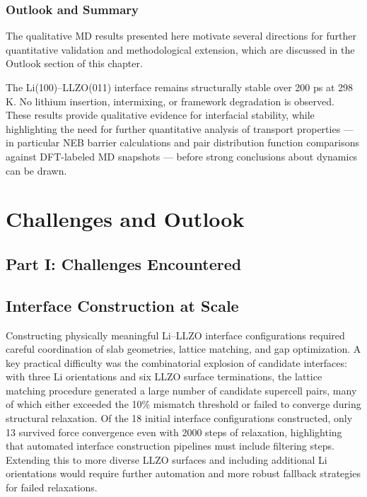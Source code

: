 \documentclass[12pt,a4paper,oneside]{book}
\begin{document}
\subsection{Outlook and Summary}

The qualitative MD results presented here motivate several directions for further
quantitative validation and methodological extension, which are discussed in the Outlook section of this chapter.

The Li(100)--LLZO(011) interface remains structurally stable over 200 ps at 298 K. No lithium insertion, intermixing, or framework degradation is observed. These results provide qualitative evidence for interfacial stability, while
highlighting the need for further quantitative analysis of transport properties ---
in particular NEB barrier calculations and pair distribution function comparisons
against DFT-labeled MD snapshots --- before strong conclusions about dynamics can be drawn.

\chapter{Challenges and Outlook}

\section*{Part I: Challenges Encountered}

\section{Interface Construction at Scale}

Constructing physically meaningful Li--LLZO interface configurations required careful
coordination of slab geometries, lattice matching, and gap optimization. A key
practical difficulty was the combinatorial explosion of candidate interfaces: with
three Li orientations and six LLZO surface terminations, the lattice matching
procedure generated a large number of candidate supercell pairs, many of which
either exceeded the 10\% mismatch threshold or failed to converge during structural
relaxation. Of the 18 initial interface configurations constructed, only 13 survived
force convergence even with 2000 steps of relaxation, highlighting that automated interface construction pipelines must
include filtering steps. Extending this to more diverse LLZO surfaces and including
additional Li orientations would require further automation and more robust fallback
strategies for failed relaxations.
\end{document}
